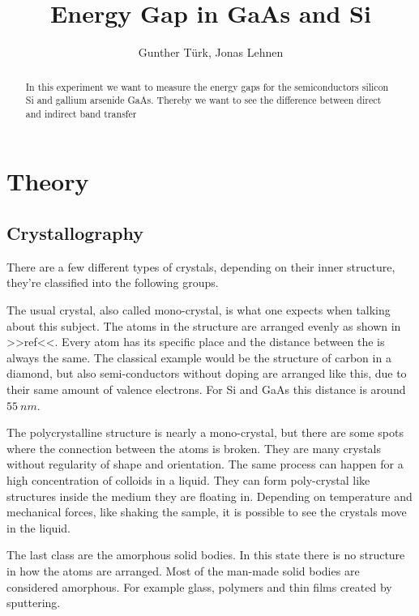 \documentclass[]{article}
\title{Energy Gap in GaAs and Si}
\author{Gunther T\"urk, Jonas Lehnen}
\begin{document}
\maketitle
\begin{abstract}
In this experiment we want to measure the energy gaps for the semiconductors silicon Si and gallium arsenide GaAs. Thereby we want to see the difference between direct and indirect band transfer

\end{abstract}

\tableofcontents


\section{Theory}
\subsection{Crystallography}
There are a few different types of crystals, depending on their inner structure, they're classified into the following groups. 

The usual crystal, also called mono-crystal, is what one expects when talking about this subject. The atoms in the structure are arranged evenly as shown in >>ref<<. Every atom has its specific place and the distance between the is always the same. The classical example would be the structure of carbon in a diamond, but also semi-conductors without doping are arranged like this, due to their same amount of valence electrons. For Si and GaAs this distance is around $55\ nm$.

The polycrystalline structure is nearly a mono-crystal, but there are some spots where the connection between the atoms is broken. They are many crystals without regularity of shape and orientation. The same process can happen for a high concentration of colloids in a liquid. They can form poly-crystal like structures inside the medium they are floating in. Depending on temperature and mechanical forces, like shaking the sample, it is possible to see the crystals move in the liquid.


The last class are the amorphous solid bodies. In this state there is no structure in how the atoms are arranged. Most of the man-made solid bodies are considered amorphous. For example glass, polymers and thin films created by sputtering. 
\end{document}
